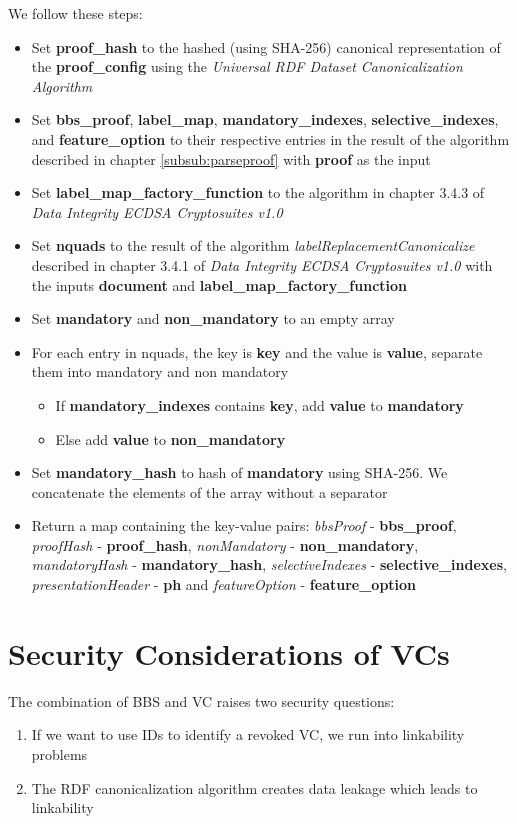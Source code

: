 \documentclass[
	a4paper               %
	,BCOR=0mm            %
	,bibliography=totoc   %
	,listof=totoc         %
	,monolingual
	,twoside=false
]{bfhthesis}              %
\begin{document}
We follow these steps:
\begin{itemize}
	\item Set \textbf{proof\_hash} to the hashed (using SHA-256) canonical representation of the \textbf{proof\_config} using the \textit{Universal RDF Dataset Canonicalization Algorithm}\cite{rdf}
	\item Set \textbf{bbs\_proof}, \textbf{label\_map}, \textbf{mandatory\_indexes}, \textbf{selective\_indexes}, \textbf{} and \textbf{feature\_option} to their respective entries in the result of the algorithm described in chapter \ref{subsub:parseproof} with \textbf{proof} as the input
	\item Set \textbf{label\_map\_factory\_function} to the algorithm in chapter 3.4.3 of \textit{Data Integrity ECDSA Cryptosuites v1.0}\cite{ecdsa}
	\item Set \textbf{nquads} to the result of the algorithm \textit{labelReplacementCanonicalize} described in chapter 3.4.1 of \textit{Data Integrity ECDSA Cryptosuites v1.0}\cite{ecdsa} with the inputs \textbf{document} and \textbf{label\_map\_factory\_function}
	\item Set \textbf{mandatory} and \textbf{non\_mandatory} to an empty array
	\item For each entry in nquads, the key is \textbf{key} and the value is \textbf{value}, separate them into mandatory and non mandatory
	\begin{itemize}
		\item If \textbf{mandatory\_indexes} contains \textbf{key}, add \textbf{value} to \textbf{mandatory}
		\item Else add \textbf{value} to \textbf{non\_mandatory}
	\end{itemize}
	\item Set \textbf{mandatory\_hash} to hash of \textbf{mandatory} using SHA-256. We concatenate the elements of the array without a separator
	\item Return a map containing the key-value pairs: \textit{bbsProof} - \textbf{bbs\_proof}, \textit{proofHash} - \textbf{proof\_hash}, \textit{nonMandatory} - \textbf{non\_mandatory}, \textit{mandatoryHash} - \textbf{mandatory\_hash}, \textit{selectiveIndexes} - \textbf{selective\_indexes}, \textit{presentationHeader} - \textbf{ph} and \textit{featureOption} - \textbf{feature\_option}
\end{itemize}

\section{Security Considerations of VCs}
\label{subsec:vcseccons}
The combination of BBS and VC raises two security questions:
\begin{enumerate}
	\item If we want to use IDs to identify a revoked VC, we run into linkability problems
	\item The RDF canonicalization algorithm creates data leakage which leads to linkability
\end{enumerate}
\end{document}
